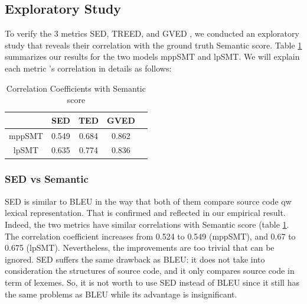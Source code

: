 \subsection{Exploratory Study}
To verify the 3 metrics SED, TREED, and GVED , we conducted an exploratory study that reveals their correlation with the ground truth Semantic score. Table \ref{table:correlation} summarizes our results for the two models mppSMT and lpSMT. We will explain each metric \rq s correlation in details as follows:

\begin{table}
\caption{Correlation Coefficients with Semantic score}
\begin{tabular}{|c|c|c|c|c|}
\hline
 & SED & TED & GVED\\
\hline
mppSMT  & 0.549 & 0.684 & 0.862 \\
lpSMT  & 0.635 & 0.774 & 0.836 \\
\hline
\end{tabular}
\label{table:correlation}
\end{table}


\subsubsection{\textbf{SED vs Semantic}}
SED is similar to BLEU in the way that both of them compare source code qw lexical representation. That is confirmed and reflected in our empirical result. Indeed, the two metrics have similar correlations with Semantic score (table \ref{table:correlation}. The correlation coefficient increases from 0.524 to 0.549 (mppSMT), and 0.67 to 0.675 (lpSMT). Nevertheless, the improvements are too trivial that can be ignored. SED suffers the same drawback as BLEU: it does not take into consideration the structures of source code, and it only compares source code in term of lexemes. 
So, it is not worth to use SED instead of BLEU since it still has the same problems as BLEU while its advantage is insignificant. 

%


